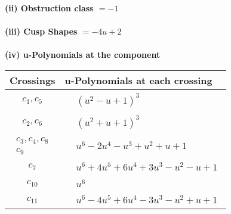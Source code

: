\documentclass[1p]{elsarticle_modified}
\theoremstyle{definition}
\begin{document}
\flushleft \textbf{(ii) Obstruction class $= -1$}\\~\\
\flushleft \textbf{(iii) Cusp Shapes $= -4 u+2$}\\~\\
\newpage\renewcommand{\arraystretch}{1}
\flushleft \textbf{(iv) u-Polynomials at the component}\newline \\
\begin{tabular}{m{50pt}|m{274pt}}
Crossings & \hspace{64pt}u-Polynomials at each crossing \\
\hline $$\begin{aligned}c_{1},c_{5}\end{aligned}$$&$\begin{aligned}
&(u^2- u+1)^3
\end{aligned}$\\
\hline $$\begin{aligned}c_{2},c_{6}\end{aligned}$$&$\begin{aligned}
&(u^2+u+1)^3
\end{aligned}$\\
\hline $$\begin{aligned}c_{3},c_{4},c_{8}\\c_{9}\end{aligned}$$&$\begin{aligned}
&u^6-2 u^4- u^3+u^2+u+1
\end{aligned}$\\
\hline $$\begin{aligned}c_{7}\end{aligned}$$&$\begin{aligned}
&u^6+4 u^5+6 u^4+3 u^3- u^2- u+1
\end{aligned}$\\
\hline $$\begin{aligned}c_{10}\end{aligned}$$&$\begin{aligned}
&u^6
\end{aligned}$\\
\hline $$\begin{aligned}c_{11}\end{aligned}$$&$\begin{aligned}
&u^6-4 u^5+6 u^4-3 u^3- u^2+u+1
\end{aligned}$\\
\hline
\end{tabular}\\~\\
\end{document}
